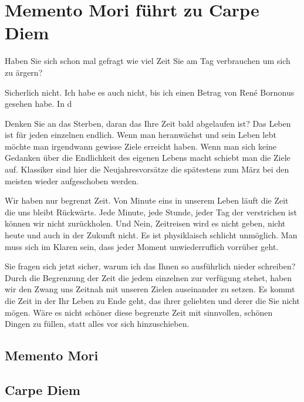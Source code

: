 \chapter{Memento Mori führt zu Carpe Diem}
Haben Sie sich schon mal gefragt wie viel Zeit Sie am Tag verbrauchen um sich zu ärgern?\par
Sicherlich nicht. Ich habe es auch nicht, bis ich einen Betrag von René Bornonus gesehen habe. In d







Denken Sie an das Sterben, daran das Ihre Zeit bald abgelaufen ist? Das Leben ist für jeden einzelnen endlich. 
Wenn man heranwächst und sein Leben lebt möchte man irgendwann gewisse Ziele erreicht haben. Wenn man sich keine Gedanken über die Endlichkeit des eigenen Lebens macht schiebt man die Ziele auf.
Klassiker sind hier die Neujahresvorsätze die spätestens zum März bei den meisten wieder aufgeschoben werden. \par\medskip
Wir haben nur begrenzt Zeit. Von Minute eins in unserem Leben läuft die Zeit die uns bleibt Rückwärts. Jede Minute, jede Stunde, jeder Tag der verstrichen ist können wir nicht zurückholen. 
Und Nein, Zeitreisen wird es nicht geben, nicht heute und auch in der Zukunft nicht. Es ist physiklaisch schlicht unmöglich. Man muss sich im Klaren sein, dass jeder Moment unwiederruflich vorrüber geht.\par\medskip
Sie fragen sich jetzt sicher, warum ich das Ihnen so ausführlich nieder schreiben? Durch die Begrenzung der Zeit die jedem einzelnen zur verfügung stehet, haben wir den Zwang uns Zeitnah mit unseren Zielen auseinander zu setzen.
Es kommt die Zeit in der Ihr Leben zu Ende geht, das ihrer geliebten und derer die Sie nicht mögen. Wäre es nicht schöner diese begrenzte Zeit mit sinnvollen, schönen  Dingen zu füllen, statt alles vor sich hinzuschieben. \par\medskip
\section{Memento Mori}

\section{Carpe Diem}